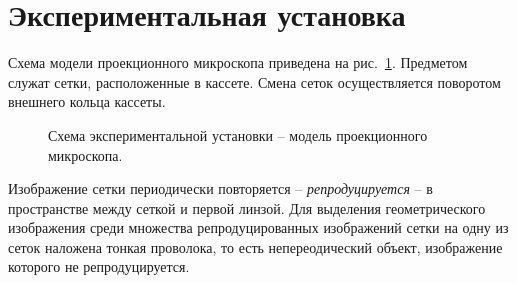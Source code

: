 \documentclass[a4paper,12pt]{article} %
\begin{document}
\section{Экспериментальная установка}
	Схема модели проекционного микроскопа приведена на рис.~\ref{ris:ustanovka}. Предметом служат сетки, расположенные в кассете. Смена сеток осуществляется поворотом внешнего кольца кассеты.
	\begin{figure}[H]
		\caption{Схема экспериментальной установки -- модель проекционного микроскопа.}
		\label{ris:ustanovka}
	\end{figure}
	Изображение сетки периодически повторяется -- \textit{репродуцируется} -- в пространстве между сеткой и первой линзой. Для выделения геометрического изображения среди множества репродуцированных изображений сетки на одну из сеток наложена тонкая проволока, то есть непереодический объект, изображение которого не репродуцируется.
	
\end{document}
